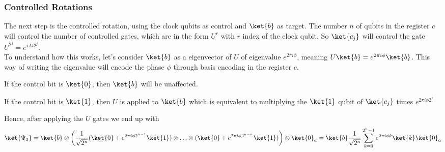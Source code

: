 \documentclass[10pt]{article}
\begin{document}
\subsubsection{Controlled Rotations}
The next step is the controlled rotation, using the clock qubits as control and $\ket{b}$ as target. The number $n$ of qubits in the register $c$ will control the number of controlled gates, which are in the form $U^r$ with $r$ index of the clock qubit. So $\ket{c_j}$ will control the gate $U^{2^j}=e^{iAt2^j}$.\\
To understand how this works, let's consider $\ket{b}$ as a eigenvector of $U$ of eigenvalue $e^{2\pi i\phi}$, meaning $U\ket{b}=e^{2\pi i\phi}\ket{b}$.
This way of writing the eigenvalue will encode the phase $\phi$ through basis encoding in the register $c$.
\begin{list}{}{}
	\item If the control bit is $\ket{0}$, then $\ket{b}$ will be unaffected.
	\item If the control bit is $\ket{1}$, then $U$ is applied to $\ket{b}$ which is equivalent to multiplying the $\ket{1}$ qubit of $\ket{c_j}$ times $e^{2\pi i\phi2^j}$
\end{list}
Hence, after applying the $U$ gates we end up with
$$\ket{\Psi_3} = \ket{b}\otimes\left(\frac{1}{\sqrt{2^n}}(\ket{0}+e^{2\pi i\phi 2^{n-1}}\ket{1})\otimes \ldots \otimes (\ket{0}+e^{2\pi i\phi 2^{n-n}}\ket{1})\right)\otimes \ket{0}_a =\ket{b}\frac{1}{\sqrt{2^n}}\sum_{k=0}^{2^n-1}e^{2\pi i\phi k}\ket{k}\ket{0}_a$$
\end{document}
